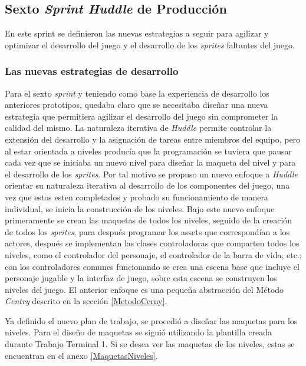 \subsection{Sexto \textit{Sprint Huddle} de Producción}
En este sprint se definieron las nuevas estrategias a seguir para agilizar y 
optimizar el desarrollo del juego y el desarrollo de los \textit{sprites} 
faltantes del juego.

\subsubsection{Las nuevas estrategias de desarrollo}
Para el sexto \textit{sprint} y teniendo como base la experiencia de desarrollo los 
anteriores prototipos, quedaba claro que se necesitaba diseñar una nueva estrategia 
que permitiera agilizar el desarrollo del juego sin comprometer la calidad del 
mismo. La naturaleza iterativa de \textit{Huddle} permite controlar la extensión del 
desarrollo y la asignación de tareas entre miembros del equipo, pero al estar 
orientada a niveles producía que la programación se tuviera que pausar cada vez 
que se iniciaba un nuevo nivel para diseñar la maqueta del nivel y para el 
desarrollo de los \textit{sprites}. Por tal motivo se propuso un nuevo enfoque a 
\textit{Huddle} 
orientar su naturaleza iterativa al desarrollo de los componentes del juego, 
una vez que estos esten completados y probado su funcionamiento de manera 
individual, se inicia la construcción de los niveles. Bajo este nuevo enfoque 
primeramente se crean las maquetas de todos los niveles, seguido de la creación 
de todos los \textit{sprites}, para después programar los assets que correspondían a 
los actores, después se implementan las clases controladoras que comparten todos 
los niveles, como el controlador del personaje, el controlador de la barra de vida, 
etc.; con los controladores comunes funcionando se crea una escena base que incluye 
el personaje jugable y la interfaz de juego, sobre esta escena se construyen los 
niveles del juego. El anterior enfoque es una pequeña abstracción del Método \textit{Centry} descrito en la sección \ref{MetodoCerny}.
\\
\par
Ya definido el nuevo plan de trabajo, se procedió a diseñar las maquetas para los 
niveles. Para el diseño de maquetas se siguió utilizando la plantilla creada 
durante Trabajo Terminal 1. Si se desea ver las maquetas de los niveles, estas se 
encuentran en el anexo \ref{MaquetasNiveles}. 
\\
\par
